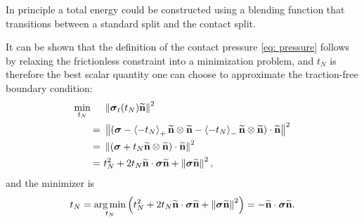 \begin{alternative}
  In principle a total energy could be constructed using a blending function that transitions between a standard split and the contact split.
\end{alternative}

It can be shown that the definition of the contact pressure \eqref{eq: pressure} follows by relaxing the frictionless constraint into a minimization problem, and $t_N$ is therefore the best scalar quantity one can choose to approximate the traction-free boundary condition:
\begin{subequations}
  \begin{align}
    \min\limits_{t_N} \quad & \ \norm{\stress_t(t_N)\xnormal}^2                                                                                    \\
    =                       & \ \norm{(\stress-\macaulay{-t_N}_+\xnormal\otimes\xnormal-\macaulay{-t_N}_- \xnormal\otimes\xnormal)\cdot\xnormal}^2 \\
    =                       & \ \norm{(\stress+t_N \xnormal\otimes\xnormal)\cdot\xnormal}^2                                                        \\
    =                       & \ t_N^2 + 2t_N\xnormal\cdot\stress\xnormal + \norm{\stress\xnormal}^2,                                               
  \end{align}
\end{subequations}
and the minimizer is
\begin{align}
  t_N = \operatorname*{arg\,min}\limits_{t_N} \left( t_N^2 + 2t_N\widetilde{\textbf{n}}\cdot\boldsymbol{\sigma}\widetilde{\textbf{n}} + \left\lVert\boldsymbol{\sigma}\widetilde{\textbf{n}}\right\rVert^2 \right) = -\widetilde{\textbf{n}}\cdot\boldsymbol{\sigma}\widetilde{\textbf{n}} .
\end{align}

